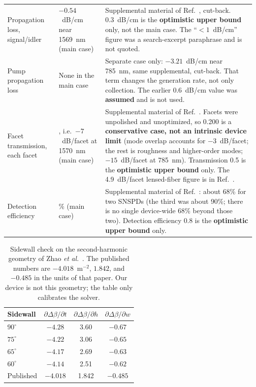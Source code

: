 \documentclass[11pt,a4paper]{article}
\begin{document}
{\begin{longtable}{@{}>{\raggedright\arraybackslash}p{2.35cm}>{\raggedright\arraybackslash}p{6.15cm}>{\raggedright\arraybackslash}p{6.55cm}@{}}
Propagation loss, signal/idler & $-0.54$~dB/cm near 1569~nm (main case) & Supplemental material of Ref.~\cite{Zhao2020}, cut-back. 0.3~dB/cm is the \textbf{optimistic upper bound} only, not the main case. The ``$<1$~dB/cm'' figure was a search-excerpt paraphrase and is not quoted. \\
Pump propagation loss & None in the main case & Separate case only: $-3.21$~dB/cm near 785~nm, same supplemental, cut-back. That term changes the generation rate, not only collection. The earlier 0.6~dB/cm value was \textbf{assumed} and is not used. \\
Facet transmission, each facet & 0.200, i.e.\ $-7$~dB/facet at 1570~nm (main case) & Supplemental material of Ref.~\cite{Zhao2020}. Facets were unpolished and unoptimized, so 0.200 is a \textbf{conservative case, not an intrinsic device limit} (mode overlap accounts for $-3$~dB/facet; the rest is roughness and higher-order modes; $-15$~dB/facet at 785~nm). Transmission 0.5 is the \textbf{optimistic upper bound} only. The 4.9~dB/facet lensed-fiber figure is in Ref.~\cite{Shi2024}. \\
Detection efficiency & 68\% (main case) & Supplemental material of Ref.~\cite{Zhao2020}: about 68\% for two SNSPDs (the third was about 90\%; there is no single device-wide 68\% beyond those two). Detection efficiency 0.8 is the \textbf{optimistic upper bound} only. \\
\end{longtable}
}


\begin{table}[ht]
\centering
\caption{Sidewall check on the second-harmonic geometry of Zhao \emph{et al.}\ \cite{ZhaoLu2023}.
The published numbers are $-4.018$~\textmu m$^{-2}$, $1.842$, and $-0.485$ in the units of that paper.
Our device is not this geometry; the table only calibrates the solver.}
\label{tab:calib}
\begin{tabular}{lccc}
\toprule
Sidewall & $\partial\Delta\beta/\partial t$ & $\partial\Delta\beta/\partial h$ & $\partial\Delta\beta/\partial w$ \\
\midrule
$90^{\circ}$ & $-4.28$ & 3.60 & $-0.67$ \\
$75^{\circ}$ & $-4.22$ & 3.06 & $-0.65$ \\
$65^{\circ}$ & $-4.17$ & 2.69 & $-0.63$ \\
$60^{\circ}$ & $-4.14$ & 2.51 & $-0.62$ \\
Published \cite{ZhaoLu2023} & $-4.018$ & 1.842 & $-0.485$ \\
\bottomrule
\end{tabular}
\end{table}
\end{document}
